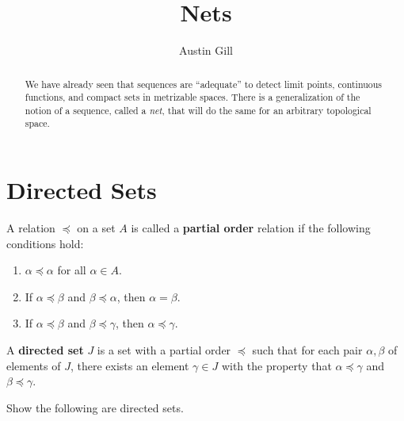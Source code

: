 \documentclass[12pt]{article}
\title{Nets}
\author{Austin Gill}
\begin{document}
\maketitle

\begin{abstract}
	We have already seen that sequences are ``adequate'' to detect limit points, continuous functions, and compact sets in metrizable spaces. There is a generalization of the notion of a sequence, called a \textit{net}, that will do the same for an arbitrary topological space.
\end{abstract}

\section{Directed Sets}
\begin{defn}
	A relation $\preceq$ on a set $A$ is called a \textbf{partial order} relation if the following conditions hold:
	\begin{enumerate}
		\item $\alpha \preceq \alpha$ for all $\alpha \in A$.
		\item If $\alpha \preceq \beta$ and $\beta \preceq \alpha$, then $\alpha = \beta$.
		\item If $\alpha \preceq \beta$ and $\beta \preceq \gamma$, then $\alpha \preceq \gamma$.
	\end{enumerate}
\end{defn}

\begin{defn}
	A \textbf{directed set} $J$ is a set with a partial order $\preceq$ such that for each pair $\alpha, \beta$ of elements of $J$, there exists an element $\gamma \in J$ with the property that $\alpha \preceq \gamma$ and $\beta \preceq \gamma$.
\end{defn}
Show the following are directed sets.
\end{document}
